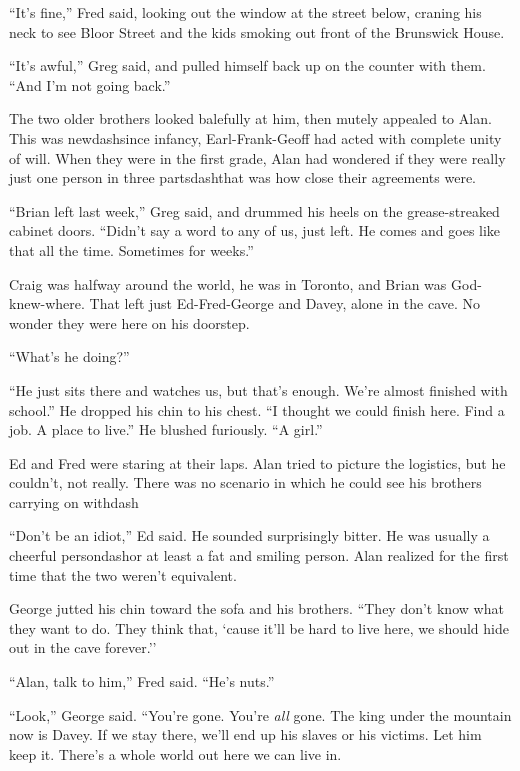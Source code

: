``It's fine,'' Fred said, looking out the window at the street below,
craning his neck to see Bloor Street and the kids smoking out front of
the Brunswick House.

``It's awful,'' Greg said, and pulled himself back up on the counter
with them.  ``And I'm not going back.''

The two older brothers looked balefully at him, then mutely appealed
to Alan.  This was newdash{}since infancy, Earl-Frank-Geoff had acted
with complete unity of will.  When they were in the first grade, Alan
had wondered if they were really just one person in three partsdash{}that
was how close their agreements were.

``Brian left last week,'' Greg said, and drummed his heels on the
grease-streaked cabinet doors.  ``Didn't say a word to any of us, just
left.  He comes and goes like that all the time.  Sometimes for
weeks.''

Craig was halfway around the world, he was in Toronto, and Brian was
God-knew-where.  That left just Ed-Fred-George and Davey, alone in the
cave.  No wonder they were here on his doorstep.

``What's he doing?''

``He just sits there and watches us, but that's enough.  We're almost
finished with school.'' He dropped his chin to his chest.  ``I thought
we could finish here.  Find a job.  A place to live.'' He blushed
furiously.  ``A girl.''

Ed and Fred were staring at their laps.  Alan tried to picture the
logistics, but he couldn't, not really.  There was no scenario in
which he could see his brothers carrying on withdash{}

``Don't be an idiot,'' Ed said.  He sounded surprisingly bitter.  He
was usually a cheerful persondash{}or at least a fat and smiling person. 
Alan realized for the first time that the two weren't equivalent.

George jutted his chin toward the sofa and his brothers.  ``They don't
know what they want to do.  They think that, `cause it'll be hard to
live here, we should hide out in the cave forever.''

``Alan, talk to him,'' Fred said.  ``He's nuts.''

``Look,'' George said.  ``You're gone.  You're \textit{all} gone.  The
king under the mountain now is Davey.  If we stay there, we'll end up
his slaves or his victims.  Let him keep it.  There's a whole world
out here we can live in.

